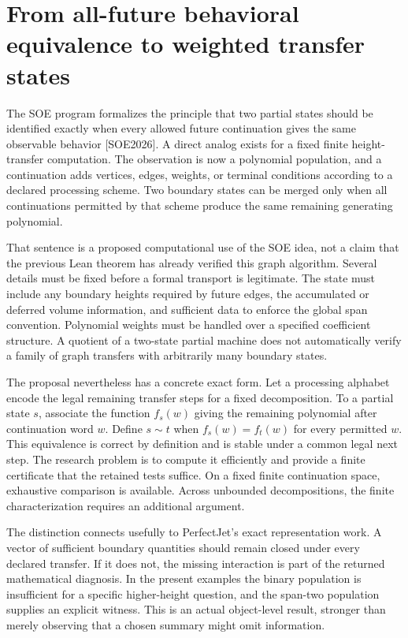 \documentclass[
  11pt,
  a4paper,
]{report}
\begin{document}
\hypertarget{from-all-future-behavioral-equivalence-to-weighted-transfer-states}{%
\section{From all-future behavioral equivalence to weighted transfer
states}\label{from-all-future-behavioral-equivalence-to-weighted-transfer-states}}

The SOE program formalizes the principle that two partial states should
be identified exactly when every allowed future continuation gives the
same observable behavior {[}SOE2026{]}. A direct analog exists for a
fixed finite height-transfer computation. The observation is now a
polynomial population, and a continuation adds vertices, edges, weights,
or terminal conditions according to a declared processing scheme. Two
boundary states can be merged only when all continuations permitted by
that scheme produce the same remaining generating polynomial.

That sentence is a proposed computational use of the SOE idea, not a
claim that the previous Lean theorem has already verified this graph
algorithm. Several details must be fixed before a formal transport is
legitimate. The state must include any boundary heights required by
future edges, the accumulated or deferred volume information, and
sufficient data to enforce the global span convention. Polynomial
weights must be handled over a specified coefficient structure. A
quotient of a two-state partial machine does not automatically verify a
family of graph transfers with arbitrarily many boundary states.

The proposal nevertheless has a concrete exact form. Let a processing
alphabet encode the legal remaining transfer steps for a fixed
decomposition. To a partial state \(s\), associate the function
\(f_s(w)\) giving the remaining polynomial after continuation word
\(w\). Define \(s\sim t\) when \(f_s(w)=f_t(w)\) for every permitted
\(w\). This equivalence is correct by definition and is stable under a
common legal next step. The research problem is to compute it
efficiently and provide a finite certificate that the retained tests
suffice. On a fixed finite continuation space, exhaustive comparison is
available. Across unbounded decompositions, the finite characterization
requires an additional argument.

The distinction connects usefully to PerfectJet's exact representation
work. A vector of sufficient boundary quantities should remain closed
under every declared transfer. If it does not, the missing interaction
is part of the returned mathematical diagnosis. In the present examples
the binary population is insufficient for a specific higher-height
question, and the span-two population supplies an explicit witness. This
is an actual object-level result, stronger than merely observing that a
chosen summary might omit information.
\end{document}
